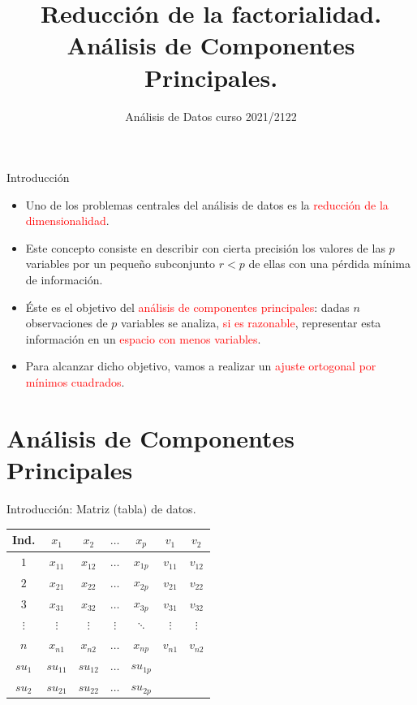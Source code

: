 \documentclass[
  ignorenonframetext,
]{beamer}
\title{Reducción de la factorialidad. Análisis de Componentes
Principales.}
\author{Análisis de Datos curso 2021/2122}
\date{}
\providecommand{\tightlist}{%
  \setlength{\itemsep}{0pt}\setlength{\parskip}{0pt}}
\newcommand\red[1]{\textcolor{red}{#1}}
\begin{document}
\frame{\titlepage}

\begin{frame}{Introducción}
\protect\hypertarget{introducciuxf3n}{}
\begin{itemize}
\tightlist
\item
  Uno de los problemas centrales del análisis de datos es la
  \red{reducción de la dimensionalidad}.
\item
  Este concepto consiste en describir con cierta precisión los valores
  de las \(p\) variables por un pequeño subconjunto \(r<p\) de ellas con
  una pérdida mínima de información.
\item
  Éste es el objetivo del \red{análisis de componentes principales}:
  dadas \(n\) observaciones de \(p\) variables se analiza,
  \red{si es razonable}, representar esta información en un
  \red{espacio con menos variables}.
\item
  Para alcanzar dicho objetivo, vamos a realizar un
  \red{ajuste ortogonal por mínimos cuadrados}.
\end{itemize}
\end{frame}

\hypertarget{anuxe1lisis-de-componentes-principales}{%
\section{Análisis de Componentes
Principales}\label{anuxe1lisis-de-componentes-principales}}

\begin{frame}{Introducción: Matriz (tabla) de datos.}
\protect\hypertarget{introducciuxf3n-matriz-tabla-de-datos.}{}
\begin{table}
\centering
\begin{tabular}{c|cccc|cc|}
Ind. & $x_1$ & $x_2$ & $\ldots$ & $x_p$ & $v_1$ & $v_2$\\
\hline
$1$      & $x_{11}$ & $x_{12}$ & $\ldots$  & $x_{1p}$ & $v_{11}$ & $v_{12}$ \\
$2$      & $x_{21}$ & $x_{22}$ & $\ldots$  & $x_{2p}$ & $v_{21}$ & $v_{22}$ \\
$3$      & $x_{31}$ & $x_{32}$ & $\ldots$  & $x_{3p}$ & $v_{31}$ & $v_{32}$ \\
$\vdots$ & $\vdots$ & $\vdots$ & $\vdots$  & $\ddots$ & $\vdots$ & $\vdots$ \\
$n$      & $x_{n1}$ & $x_{n2}$ & $\ldots$  & $x_{np}$ & $v_{n1}$ & $v_{n2}$ \\
 \hline
$su_1$   &$su_{11}$ &$su_{12}$ & $\ldots$  &$su_{1p}$ &\multicolumn{2}{|c}{}\\
$su_2$   &$su_{21}$ &$su_{22}$ & $\ldots$  &$su_{2p}$ &\multicolumn{2}{|c}{}\\
\cline{1-5}
\end{tabular}
\end{table}
\end{frame}
\end{document}
